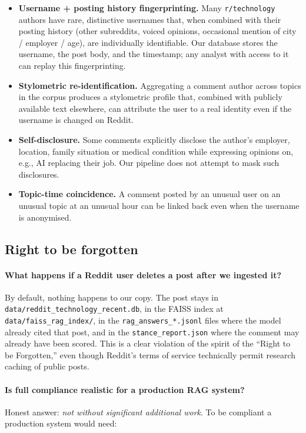 \documentclass[11pt,a4paper]{article}
\begin{document}
\begin{itemize}
  \item \textbf{Username + posting history fingerprinting.} Many \texttt{r/technology} authors
        have rare, distinctive usernames that, when combined with their posting history (other
        subreddits, voiced opinions, occasional mention of city / employer / age), are
        individually identifiable. Our database stores the username, the post body, and the
        timestamp; any analyst with access to it can replay this fingerprinting.
  \item \textbf{Stylometric re-identification.} Aggregating a comment author across topics in
        the corpus produces a stylometric profile that, combined with publicly available text
        elsewhere, can attribute the user to a real identity even if the username is changed
        on Reddit.
  \item \textbf{Self-disclosure.} Some comments explicitly disclose the author's employer,
        location, family situation or medical condition while expressing opinions on, e.g.,
        AI replacing their job. Our pipeline does not attempt to mask such disclosures.
  \item \textbf{Topic-time coincidence.} A comment posted by an unusual user on an unusual
        topic at an unusual hour can be linked back even when the username is anonymised.
\end{itemize}

\subsection{Right to be forgotten}

\paragraph{What happens if a Reddit user deletes a post after we ingested it?}
By default, nothing happens to our copy. The post stays in
\texttt{data/reddit\_technology\_recent.db}, in the FAISS index at
\texttt{data/faiss\_rag\_index/}, in the \texttt{rag\_answers\_*.jsonl} files where the model
already cited that post, and in the \texttt{stance\_report.json} where the comment may already
have been scored. This is a clear violation of the spirit of the
``Right to be Forgotten,'' even though Reddit's terms of service technically permit research
caching of public posts.

\paragraph{Is full compliance realistic for a production RAG system?}
Honest answer: \emph{not without significant additional work}. To be compliant a production
system would need:
\end{document}
